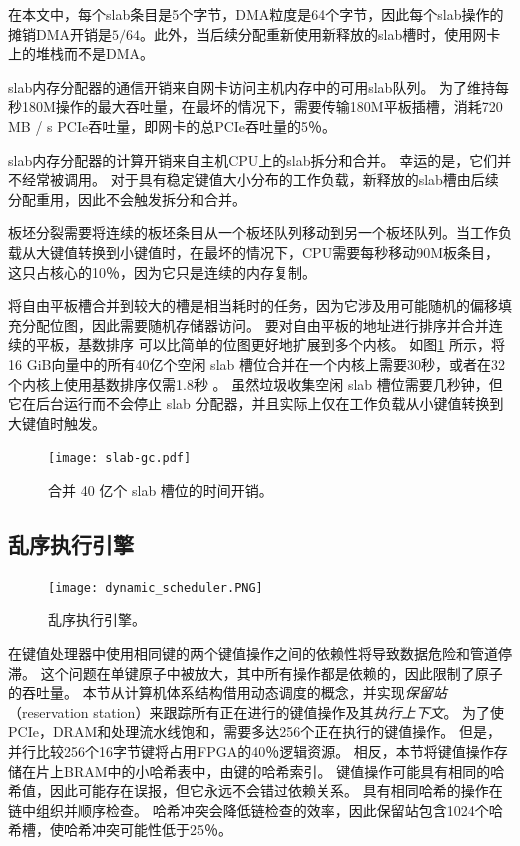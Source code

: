在本文中，每个slab条目是5个字节，DMA粒度是64个字节，因此每个slab操作的摊销DMA开销是$ 5/64 $。此外，当后续分配重新使用新释放的slab槽时，使用网卡上的堆栈而不是DMA。

\label{kvdirect:sec:slab-eval}


slab内存分配器的通信开销来自网卡访问主机内存中的可用slab队列。
为了维持每秒180M操作的最大吞吐量，在最坏的情况下，需要传输180M平板插槽，消耗720 MB / s PCIe吞吐量，即网卡的总PCIe吞吐量的5％。

slab内存分配器的计算开销来自主机CPU上的slab拆分和合并。
幸运的是，它们并不经常被调用。
对于具有稳定键值大小分布的工作负载，新释放的slab槽由后续分配重用，因此不会触发拆分和合并。

板坯分裂需要将连续的板坯条目从一个板坯队列移动到另一个板坯队列。当工作负载从大键值转换到小键值时，在最坏的情况下，CPU需要每秒移动90M板条目，这只占核心的10％，因为它只是连续的内存复制。

将自由平板槽合并到较大的槽是相当耗时的任务，因为它涉及用可能随机的偏移填充分配位图，因此需要随机存储器访问。
要对自由平板的地址进行排序并合并连续的平板，基数排序 \cite {satish2010fast} 可以比简单的位图更好地扩展到多个内核。
如图\ref {kvdirect:fig:slab-garbage-collection} 所示，将16 GiB向量中的所有40亿个空闲 slab 槽位合并在一个内核上需要30秒，或者在32个内核上使用基数排序仅需1.8秒 \cite{satish2010fast}。
虽然垃圾收集空闲 slab 槽位需要几秒钟，但它在后台运行而不会停止 slab 分配器，并且实际上仅在工作负载从小键值转换到大键值时触发。


\begin{figure}[t]
	\centering
	\texttt{[image: slab-gc.pdf]}
	\caption{合并 40 亿个 slab 槽位的时间开销。}
	\label{kvdirect:fig:slab-garbage-collection}
\end{figure}




\subsection{乱序执行引擎}
\label{kvdirect:sec:ooo}

\begin{figure}[htbp]
\centering
\texttt{[image: dynamic\_scheduler.PNG]}
\caption{乱序执行引擎。}
\label{kvdirect:fig:ooo-mem-access}
\end{figure}

在键值处理器中使用相同键的两个键值操作之间的依赖性将导致数据危险和管道停滞。
这个问题在单键原子中被放大，其中所有操作都是依赖的，因此限制了原子的吞吐量。
本节从计算机体系结构借用动态调度的概念，并实现\textit {保留站}（reservation station）来跟踪所有正在进行的键值操作及其\textit {执行上下文}。
为了使PCIe，DRAM和处理流水线饱和，需要多达256个正在执行的键值操作。
但是，并行比较256个16字节键将占用FPGA的40％逻辑资源。
相反，本节将键值操作存储在片上BRAM中的小哈希表中，由键的哈希索引。
键值操作可能具有相同的哈希值，因此可能存在误报，但它永远不会错过依赖关系。
具有相同哈希的操作在链中组织并顺序检查。
哈希冲突会降低链检查的效率，因此保留站包含1024个哈希槽，使哈希冲突可能性低于25％。

